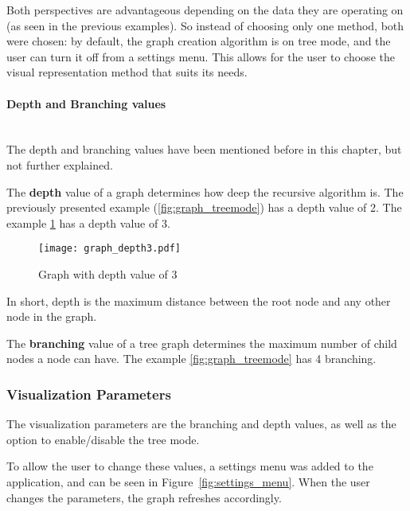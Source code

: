       Both perspectives are advantageous depending on the data they are operating on (as seen in the previous examples).
      So instead of choosing only one method, both were chosen: by default, the graph creation algorithm is on tree mode, and the user can turn it off from a settings menu.
      This allows for the user to choose the visual representation method that suits its needs.

      \paragraph{Depth and Branching values} \hfill \\
      The depth and branching values have been mentioned before in this chapter, but not further explained.

      The \textbf{depth} value of a graph determines how deep the recursive algorithm is.
      The previously presented example (\ref{fig:graph_treemode}) has a depth value of 2.
      The example \ref{fig:graph_depth3} has a depth value of 3.
      \begin{figure}[tb]
        \begin{center}
          \texttt{[image: graph\_depth3.pdf]}
        \end{center}
        \caption{Graph with depth value of 3}
        \label{fig:graph_depth3}
      \end{figure}
      In short, depth is the maximum distance between the root node and any other node in the graph.

      The \textbf{branching} value of a tree graph determines the maximum number of child nodes a node can have.
      The example \ref{fig:graph_treemode} has 4 branching.


    \subsubsection{Visualization Parameters} %
    \label{ssub:visualization_parameters}
    
    The visualization parameters are the branching and depth values, as well as the option to enable/disable the tree mode.

    To allow the user to change these values, a settings menu was added to the application, and can be seen in Figure~\ref{fig:settings_menu}.
    When the user changes the parameters, the graph refreshes accordingly.

